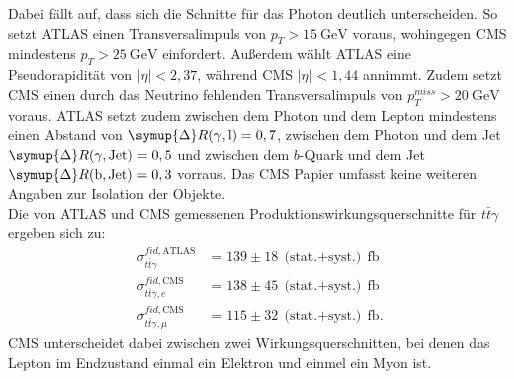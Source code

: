 Dabei fällt auf, dass sich die Schnitte für das Photon deutlich unterscheiden. So setzt ATLAS einen Transversalimpuls von $p_{T} > \SI{15}{\giga\electronvolt}$ voraus, wohingegen CMS mindestens $p_{T} > \SI{25}{\giga\electronvolt}$ einfordert. Außerdem wählt ATLAS eine Pseudorapidität von $|\eta| < 2,37$, während CMS $|\eta| < 1,44$ annimmt. Zudem setzt CMS einen durch das Neutrino fehlenden Transversalimpuls von $p_{T}^{miss} > \SI{20}{\giga\electronvolt}$ voraus.
ATLAS setzt zudem zwischen dem Photon und dem Lepton mindestens einen Abstand von $\symup{\Delta} R(\gamma, \text{l}) = 0,7$, zwischen dem Photon und dem Jet $\symup{\Delta} R(\gamma, \text{Jet}) = 0,5$ und zwischen dem $b$-Quark und dem Jet $\symup{\Delta} R(\text{b}, \text{Jet}) = 0,3$ vorraus.
Das CMS Papier umfasst keine weiteren Angaben zur Isolation der Objekte.\\
Die von ATLAS und CMS gemessenen Produktionswirkungsquerschnitte für $t\bar{t}\gamma$ ergeben sich zu:
\begin{align*}
  \sigma^{fid, \text{ATLAS}}_{t\bar{t}\gamma} &= 139 \pm 18~\text{(stat.$+$syst.)}~ \si{\femto\barn}\\
  \sigma^{fid, \text{CMS}}_{t\bar{t}\gamma, e} &= 138 \pm 45~\text{(stat.$+$syst.)}~ \si{\femto\barn}\\
  \sigma^{fid, \text{CMS}}_{t\bar{t}\gamma, \mu} &= 115 \pm 32~\text{(stat.$+$syst.)}~ \si{\femto\barn}.
\end{align*}
CMS unterscheidet dabei zwischen zwei Wirkungsquerschnitten, bei denen das Lepton im Endzustand einmal ein Elektron und einmel ein Myon ist.

